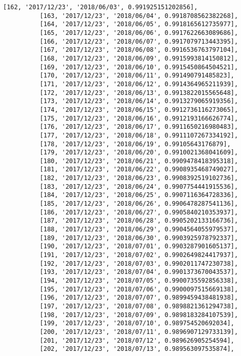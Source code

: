 \documentclass[11pt]{article}
\begin{document}
\begin{Verbatim}[commandchars=\\\{\}]
          [162, '2017/12/23', '2018/06/03', 0.991925151202856],
          [163, '2017/12/23', '2018/06/04', 0.9918708562382268],
          [164, '2017/12/23', '2018/06/05', 0.9918165612735977],
          [165, '2017/12/23', '2018/06/06', 0.9917622663089686],
          [166, '2017/12/23', '2018/06/07', 0.9917079713443395],
          [167, '2017/12/23', '2018/06/08', 0.9916536763797104],
          [168, '2017/12/23', '2018/06/09', 0.9915993814150812],
          [169, '2017/12/23', '2018/06/10', 0.9915450864504521],
          [170, '2017/12/23', '2018/06/11', 0.991490791485823],
          [171, '2017/12/23', '2018/06/12', 0.9914364965211939],
          [172, '2017/12/23', '2018/06/13', 0.9913822015565648],
          [173, '2017/12/23', '2018/06/14', 0.9913279065919356],
          [174, '2017/12/23', '2018/06/15', 0.9912736116273065],
          [175, '2017/12/23', '2018/06/16', 0.9912193166626774],
          [176, '2017/12/23', '2018/06/17', 0.9911650216980483],
          [177, '2017/12/23', '2018/06/18', 0.9911107267334192],
          [178, '2017/12/23', '2018/06/19', 0.99105643176879],
          [179, '2017/12/23', '2018/06/20', 0.9910021368041609],
          [180, '2017/12/23', '2018/06/21', 0.9909478418395318],
          [181, '2017/12/23', '2018/06/22', 0.9908935468749027],
          [182, '2017/12/23', '2018/06/23', 0.9908392519102736],
          [183, '2017/12/23', '2018/06/24', 0.9907754441915536],
          [184, '2017/12/23', '2018/06/25', 0.9907116364728336],
          [185, '2017/12/23', '2018/06/26', 0.9906478287541136],
          [186, '2017/12/23', '2018/06/27', 0.9905840210353937],
          [187, '2017/12/23', '2018/06/28', 0.9905202133166736],
          [188, '2017/12/23', '2018/06/29', 0.9904564055979537],
          [189, '2017/12/23', '2018/06/30', 0.9903925978792337],
          [190, '2017/12/23', '2018/07/01', 0.9903287901605137],
          [191, '2017/12/23', '2018/07/02', 0.9902649824417937],
          [192, '2017/12/23', '2018/07/03', 0.9902011747230738],
          [193, '2017/12/23', '2018/07/04', 0.9901373670043537],
          [194, '2017/12/23', '2018/07/05', 0.9900735592856338],
          [195, '2017/12/23', '2018/07/06', 0.9900097515669138],
          [196, '2017/12/23', '2018/07/07', 0.9899459438481938],
          [197, '2017/12/23', '2018/07/08', 0.9898821361294738],
          [198, '2017/12/23', '2018/07/09', 0.9898183284107539],
          [199, '2017/12/23', '2018/07/10', 0.989754520692034],
          [200, '2017/12/23', '2018/07/11', 0.9896907129733139],
          [201, '2017/12/23', '2018/07/12', 0.989626905254594],
          [202, '2017/12/23', '2018/07/13', 0.989563097535874],

\end{Verbatim}
\end{document}
